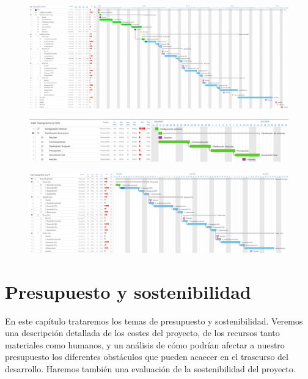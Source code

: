 \documentclass[titlepage,12pt]{report}
\begin{document}
\uselandscape

\begin{figure}[H]
	\centering
	\includegraphics[scale=1.45]{media/final_gantt.png}
	\label{gantt}
\end{figure}

\begin{figure}[H]
	\centering
  	\includegraphics[scale=1.5]{media/final_gantt_1.png}
  	\label{gantt_1}
\end{figure}

\begin{figure}[H]
	\centering
  	\includegraphics[scale=1.25]{media/final_gantt_2.png}
  	\label{gantt_2}
\end{figure}

\useportrait

\chapter{Presupuesto y sostenibilidad}

En este capítulo trataremos los temas de presupuesto y sostenibilidad. Veremos una descripción detallada de los costes del proyecto, de los recursos tanto materiales como humanos, y un análisis de cómo podrían afectar a nuestro presupuesto los diferentes obstáculos que pueden acaecer en el trascurso del desarrollo. Haremos también una evaluación de la sostenibilidad del proyecto.
\end{document}
